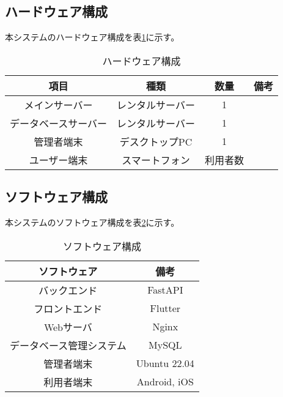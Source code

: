 \subsection{ハードウェア構成}
本システムのハードウェア構成を表\ref{tab:hardware_configuration}に示す。
\begin{table}[H]
 \centering
 \begin{tabular}{|c|c|c|c|}
 \hline
 項目 & 種類 & 数量 & 備考\\
 \hline
 メインサーバー & レンタルサーバー & 1 & \\
 \hline
 データベースサーバー & レンタルサーバー & 1 & \\
 \hline
 管理者端末 & デスクトップPC & 1 & \\
 \hline
 ユーザー端末 & スマートフォン & 利用者数 & \\
    \hline
 \end{tabular}
 \caption{ハードウェア構成}
 \label{tab:hardware_configuration}
\end{table}

\subsection{ソフトウェア構成}
本システムのソフトウェア構成を表\ref{tab:software_configuration}に示す。
\begin{table}[H]
 \centering
 \begin{tabular}{|c|c|}
 \hline
 ソフトウェア & 備考\\
 \hline
 バックエンド & FastAPI\\
 \hline
 フロントエンド & Flutter\\
 \hline
 Webサーバ & Nginx\\
 \hline
 データベース管理システム & MySQL\\
 \hline
 管理者端末 & Ubuntu 22.04\\
 \hline
 利用者端末 & Android, iOS\\
 \hline
 \end{tabular}
 \caption{ソフトウェア構成}
 \label{tab:software_configuration}
\end{table}